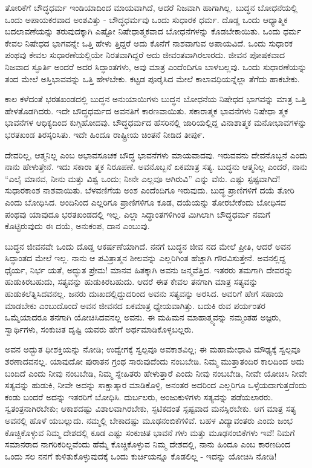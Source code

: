ತೋರಿಕೆಗೆ ಬೌದ್ಧಧರ್ಮ ಇಂಡಿಯಾದಿಂದ ಮಾಯವಾಗಿದೆ, ಆದರೆ ನಿಜವಾಗಿ ಹಾಗಾಗಿಲ್ಲ. ಬುದ್ಧನ ಬೋಧನೆಯಲ್ಲಿ ಒಂದು ಅಪಾಯಕರವಾದ ಅಂಶವಿತ್ತು - ಬೌದ್ಧಧರ್ಮವು ಒಂದು ಸುಧಾರಕ ಧರ್ಮ. ದೊಡ್ಡ ಒಂದು ಆಧ್ಯಾತ್ಮಿಕ ಬದಲಾವಣೆಯನ್ನು ತರುವುದಕ್ಕಾಗಿ ಎಷ್ಟೋ ನಿಷೇಧಾತ್ಮಕವಾದ ಬೋಧನೆಗಳನ್ನು ಕೊಡಬೇಕಾಯಿತು. ಒಂದು ಧರ್ಮ ಕೇವಲ ನಿಷೇಧದ ಭಾಗವನ್ನೇ ಒತ್ತಿ ಹೇಳು ತ್ತಿದ್ದರೆ ಅದು ಕೊನೆಗೆ ನಾಶವಾಗುವ ಅಪಾಯವಿದೆ. ಒಂದು ಸುಧಾರಕ ಪಂಥವು ಕೇವಲ ಸುಧಾರಣೆಯಲ್ಲಿಯೇ ನಿರತವಾಗಿದ್ದರೆ ಅದು ಜೀವಂತವಾಗಿರಲಾರದು. ಜೀವನ ಪೋಷಕವಾದ ನಿಜವಾದ ಸ್ಫೂರ್ತಿ ಅಂದರೆ ಅದರ ಸಿದ್ಧಾಂತಗಳು, ಅವು ಮಾತ್ರ ಎಂದೆಂದಿಗೂ ಬಾಳಬಲ್ಲವು. ಒಂದು ಸುಧಾರಣೆಯನ್ನು ತಂದ ಮೇಲೆ ಅಸ್ತಿಭಾವವನ್ನು ಒತ್ತಿ ಹೇಳಬೇಕು. ಕಟ್ಟಡ ಪೂರೈಸಿದ ಮೇಲೆ ಕಾಲಾವಧಿಯನ್ನೆಲ್ಲಾ ತೆಗೆದು ಹಾಕಬೇಕು.

ಕಾಲ ಕಳೆದಂತೆ ಭರತಖಂಡದಲ್ಲಿ ಬುದ್ಧನ ಅನುಯಾಯಿಗಳು ಬುದ್ಧನ ಬೋಧನೆಯ ನಿಷೇಧದ ಭಾಗವನ್ನು ಮಾತ್ರ ಒತ್ತಿ ಹೇಳತೊಡಗಿದರು. ಇದೇ ಬೌದ್ಧಧರ್ಮದ ಅವನತಿಗೆ ಕಾರಣವಾಯಿತು. ಸಕಾರಾತ್ಮಕ ಭಾವನೆಗಳು ನಿಷೇಧಾ ತ್ಮಕ ಭಾವನೆಗಳ ಆಧಿಕ್ಯದಿಂದ ಕುಗ್ಗಿಹೋದವು. ಬೌದ್ಧಧರ್ಮದ ಹೆಸರಿನಲ್ಲಿ ಜಾರಿಯಲ್ಲಿದ್ದ ವಿನಾಶಾತ್ಮಕ ಮನೋಭಾವಗಳನ್ನು ಭರತಖಂಡ ತಿರಸ್ಕರಿಸಿತು. ಇದೇ ಹಿಂದೂ ರಾಷ್ಟ್ರೀಯ ಚಿಂತನೆ ನೀಡಿದ ತೀರ್ಪು.

ದೇವರಿಲ್ಲ, ಆತ್ಮನಿಲ್ಲ ಎಂಬ ಅಭಾವಸೂಚಕ ಬೌದ್ಧ ಭಾವನೆಗಳು ಮಾಯವಾದವು. ಇರುವವನು ದೇವನೊಬ್ಬನೆ ಎಂದು ನಾನು ಹೇಳುತ್ತೇನೆ. ಇದು ಸಕಾರಾ ತ್ಮಕ ನಿರೂಪಣೆ. ಅವನೊಬ್ಬನೆ ಏಕಮಾತ್ರ ಸತ್ಯ. ಬುದ್ಧನು ಆತ್ಮನಿಲ್ಲ ಎಂದರೆ, ನಾನು “ಎಲೈ ಮಾನವ, ನೀನು ಮತ್ತು ವಿಶ್ವ ಒಂದು; ನೀನೇ ಎಲ್ಲವೂ ಆಗಿರುವಿ” ಎನ್ನು ವೆನು. ಎಷ್ಟು ಸ್ಪಷ್ಟವಾಗಿದೆ! ಸುಧಾರಕಾಂಶ ನಾಶವಾಯಿತು. ಬೆಳವಣಿಗೆಯ ಅಂಶ ಎಂದೆಂದಿಗೂ ಇರುವುದು. ಬುದ್ಧ ಪ್ರಾಣಿಗಳಿಗೆ ದಯೆ ತೋರಿ ಎಂದು ಬೋಧಿಸಿದ. ಅಂದಿನಿಂದ ಎಲ್ಲರಿಗೂ ಪ್ರಾಣಿಗಳಿಗೂ ಕೂಡ, ದಯೆಯನ್ನು ತೋರಬೇಕೆಂದು ಬೋಧಿಸದ ಪಂಥವು ಯಾವುದೂ ಭರತಖಂಡದಲ್ಲಿ ಇಲ್ಲ. ಎಲ್ಲಾ ಸಿದ್ಧಾಂತಗಳಿಗಿಂತ ಮಿಗಿಲಾಗಿ ಬೌದ್ಧಧರ್ಮ ನಮಗೆ ಕೊಟ್ಟಿರುವುದು ಈ ದಯೆ, ಅನುಕಂಪ, ದಾನ ಎಂಬುವು.

ಬುದ್ಧನ ಜೀವನವೇ ಒಂದು ದೊಡ್ಡ ಆಕರ್ಷಣೆಯಾಗಿದೆ. ನನಗೆ ಬುದ್ಧನ ಜೀವ ನದ ಮೇಲೆ ಪ್ರೀತಿ, ಆದರೆ ಅವನ ಸಿದ್ಧಾಂತದ ಮೇಲೆ ಇಲ್ಲ. ನಾನು ಆ ಪವಿತ್ರಾತ್ಮನ ಶೀಲವನ್ನು ಎಲ್ಲರಿಗಿಂತ ಹೆಚ್ಚಾಗಿ ಗೌರವಿಸುತ್ತೇನೆ. ಅವನಲ್ಲಿದ್ದ ಧೈರ್ಯ, ನಿರ್ಭ ಯತೆ, ಅದ್ಭುತ ಪ್ರೇಮ! ಮಾನವ ಹಿತಕ್ಕಾಗಿ ಅವನು ಜನ್ಮವೆತ್ತಿದ. ಇತರರು ತಮಗಾಗಿ ದೇವರನ್ನು ಹುಡುಕಿರಬಹುದು, ಸತ್ಯವನ್ನು ಹುಡುಕಿರಬಹುದು. ಆದರೆ ಈತ ಕೇವಲ ತನಗಾಗಿ ಮಾತ್ರ ಸತ್ಯವನ್ನು ಹುಡುಕಲೆತ್ನಿಸಿದವನಲ್ಲ. ಜನರು ದುಃಖದಲ್ಲಿದ್ದುದರಿಂದ ಅವನು ಸತ್ಯವನ್ನು ಅರಸಿದ. ಅವರಿಗೆ ಹೇಗೆ ಸಹಾಯ ಮಾಡಬೇಕು ಎಂಬುದೊಂದೆ ಅವನ ಜೀವನದ ಏಕಮಾತ್ರ ಧ್ಯೇಯವಾಗಿತ್ತು. ಬದುಕಿ ರುವ ಪರ್ಯಂತರ ಒಮ್ಮೆಯಾದರೂ ತನಗಾಗಿ ಯೋಚಿಸಿದವನಲ್ಲ ಅವನು. ಈ ಮಹಿಮನ ಮಾಹಾತ್ಮ್ಯವನ್ನು ನಮ್ಮಂತಹ ಅಜ್ಞರು, ಸ್ವಾರ್ಥಿಗಳು, ಸಂಕುಚಿತ ದೃಷ್ಟಿ ಯವರು ಹೇಗೆ ಅರ್ಥಮಾಡಿಕೊಳ್ಳಬಲ್ಲರು.

ಅವನ ಅದ್ಭುತ ಧೀಶಕ್ತಿಯನ್ನು ನೋಡಿ; ಉದ್ವೇಗಕ್ಕೆ ಸ್ವಲ್ಪವೂ ಅವಕಾಶವಿಲ್ಲ; ಈ ಮಹಾಮೇಧಾವಿ ಮೌಢ್ಯಕ್ಕೆ ಸ್ವಲ್ಪವೂ ಶರಣಾದವನಲ್ಲ. ಯಾವುದೋ ಪುರಾತನ ಗ್ರಂಥ ಸಾರುವುದೆಂದು ನಂಬಬೇಡಿ. ನಿಮ್ಮ ಮುತ್ತಾತಂದಿರ ಕಾಲದಿಂದ ಅದು ಬಂದಿದೆ ಎಂದು ನೀವು ನಂಬಬೇಡಿ, ನಿಮ್ಮ ಸ್ನೇಹಿತರು ಹೇಳುತ್ತಾರೆ ಎಂದು ನೀವು ನಂಬಬೇಡಿ, ನೀವೇ ಯೋಚಿಸಿ ನೀವೇ ಸತ್ಯವನ್ನು ಹುಡುಕಿ, ನೀವೇ ಅದನ್ನು ಸಾಕ್ಷಾತ್ಕಾರ ಮಾಡಿಕೊಳ್ಳಿ, ಅನಂತರ ಅದರಿಂದ ಎಲ್ಲರಿಗೂ ಒಳ್ಳೆಯದಾಗುತ್ತದೆಂದು ಕಂಡು ಬಂದರೆ ಅದನ್ನು ಇತರರಿಗೆ ಬೋಧಿಸಿ. ದುರ್ಬಲರು, ಅಂಜುಕುಳಿಗಳು ಸತ್ಯವನ್ನು ಪಡೆಯಲಾರರು. ಸ್ವತಂತ್ರನಾಗಿರಬೇಕು; ಆಕಾಶದಷ್ಟು ವಿಶಾಲವಾಗಿರಬೇಕು, ಸ್ಫಟಿಕದಂತೆ ಸ್ಪಷ್ಟವಾದ ಮನಸ್ಸಿರಬೇಕು. ಆಗ ಮಾತ್ರ ಸತ್ಯ ಅವನಲ್ಲಿ ಹೊಳೆ ಯಬಲ್ಲುದು. ನಮ್ಮಲ್ಲಿ ಬೇಕಾದಷ್ಟು ಮೂಢನಂಬಿಕೆಗಳಿವೆ. ಬಹಳ ವಿದ್ಯಾವಂತರು ಎಂದು ಜಂಭ ಕೊಚ್ಚಿಕೊಳ್ಳುವ ನಿಮ್ಮ ದೇಶದಲ್ಲಿ ಕೂಡ ಎಷ್ಟು ಸಂಕುಚಿತ ಭಾವನೆ ಗಳು ಮತ್ತು ಮೂಢನಂಬಿಕೆಗಳು ಇವೆ! ನಿಮಗೆ ಸಮಾನರಾದ ನಾಗರಿಕರಿಲ್ಲವೆಂದು ಹೆಮ್ಮೆ ಕೊಚ್ಚಿಕೊಳ್ಳುವ ನಿಮ್ಮ ದೇಶದಲ್ಲಿ, ನಾನು ಹಿಂದೂ ಎಂಬ ಕಾರಣದಿಂದ ಒಂದು ಸಲ ನನಗೆ ಕುಳಿತುಕೊಳ್ಳುವುದಕ್ಕೆ ಒಂದು ಕುರ್ಚಿಯನ್ನೂ ಕೊಡಲಿಲ್ಲ - ಇದನ್ನು ಯೋಚಿಸಿ ನೋಡಿ!

